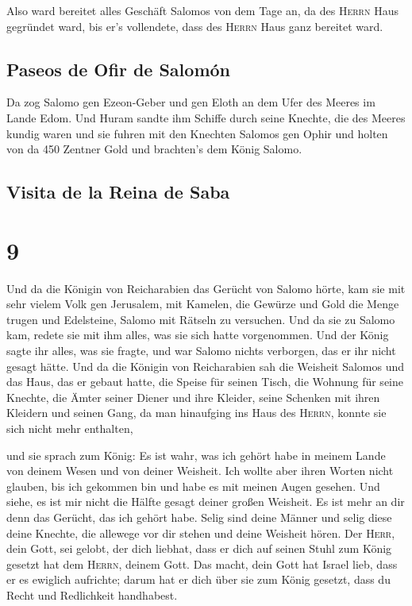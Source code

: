  Also ward bereitet alles Geschäft Salomos von dem Tage
an, da des \textsc{Herrn} Haus gegründet ward, bis er's vollendete, dass
des \textsc{Herrn} Haus ganz bereitet ward.

\hypertarget{paseos-de-ofir-de-salomuxf3n}{%
\subsection{Paseos de Ofir de
Salomón}\label{paseos-de-ofir-de-salomuxf3n}}

 Da zog Salomo gen Ezeon-Geber und gen Eloth an dem Ufer
des Meeres im Lande Edom.  Und Huram sandte ihm Schiffe
durch seine Knechte, die des Meeres kundig waren und sie fuhren mit den
Knechten Salomos gen Ophir und holten von da 450 Zentner Gold und
brachten's dem König Salomo.

\hypertarget{visita-de-la-reina-de-saba}{%
\subsection{Visita de la Reina de
Saba}\label{visita-de-la-reina-de-saba}}

\hypertarget{section-8}{%
\section{9}\label{section-8}}

 Und da die Königin von Reicharabien das Gerücht von
Salomo hörte, kam sie mit sehr vielem Volk gen Jerusalem, mit Kamelen,
die Gewürze und Gold die Menge trugen und Edelsteine, Salomo mit Rätseln
zu versuchen. Und da sie zu Salomo kam, redete sie mit ihm alles, was
sie sich hatte vorgenommen.  Und der König sagte ihr
alles, was sie fragte, und war Salomo nichts verborgen, das er ihr nicht
gesagt hätte.  Und da die Königin von Reicharabien sah die
Weisheit Salomos und das Haus, das er gebaut hatte,  die
Speise für seinen Tisch, die Wohnung für seine Knechte, die Ämter seiner
Diener und ihre Kleider, seine Schenken mit ihren Kleidern und seinen
Gang, da man hinaufging ins Haus des \textsc{Herrn}, konnte sie sich
nicht mehr enthalten,

 und sie sprach zum König: Es ist wahr, was ich gehört
habe in meinem Lande von deinem Wesen und von deiner Weisheit.
 Ich wollte aber ihren Worten nicht glauben, bis ich
gekommen bin und habe es mit meinen Augen gesehen. Und siehe, es ist mir
nicht die Hälfte gesagt deiner großen Weisheit. Es ist mehr an dir denn
das Gerücht, das ich gehört habe.  Selig sind deine Männer
und selig diese deine Knechte, die allewege vor dir stehen und deine
Weisheit hören.  Der \textsc{Herr}, dein Gott, sei gelobt,
der dich liebhat, dass er dich auf seinen Stuhl zum König gesetzt hat
dem \textsc{Herrn}, deinem Gott. Das macht, dein Gott hat Israel lieb,
dass er es ewiglich aufrichte; darum hat er dich über sie zum König
gesetzt, dass du Recht und Redlichkeit handhabest.

